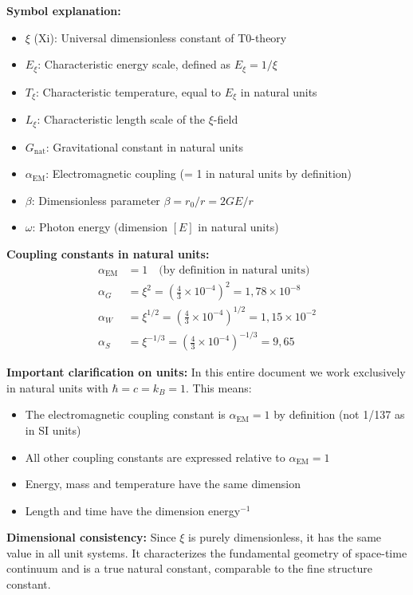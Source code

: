 \documentclass[12pt,a4paper]{report}
\begin{document}
	\textbf{Symbol explanation:}
	\begin{itemize}
		\item $\xi$ (Xi): Universal dimensionless constant of T0-theory
		\item $E_\xi$: Characteristic energy scale, defined as $E_\xi = 1/\xi$
		\item $T_\xi$: Characteristic temperature, equal to $E_\xi$ in natural units
		\item $L_\xi$: Characteristic length scale of the $\xi$-field
		\item $G_{\text{nat}}$: Gravitational constant in natural units
		\item $\alpha_{\text{EM}}$: Electromagnetic coupling (= 1 in natural units by definition)
		\item $\beta$: Dimensionless parameter $\beta = r_0/r = 2GE/r$
		\item $\omega$: Photon energy (dimension $[E]$ in natural units)
	\end{itemize}
	
	\textbf{Coupling constants in natural units:}
	\begin{align}
		\alpha_{\text{EM}} &= 1 \quad \text{(by definition in natural units)} \\
		\alpha_G &= \xi^2 = \left(\frac{4}{3} \times 10^{-4}\right)^2 = 1{,}78 \times 10^{-8} \\
		\alpha_W &= \xi^{1/2} = \left(\frac{4}{3} \times 10^{-4}\right)^{1/2} = 1{,}15 \times 10^{-2} \\
		\alpha_S &= \xi^{-1/3} = \left(\frac{4}{3} \times 10^{-4}\right)^{-1/3} = 9{,}65
	\end{align}
	
	\textbf{Important clarification on units:}
	In this entire document we work exclusively in natural units with $\hbar = c = k_B = 1$. This means:
	\begin{itemize}
		\item The electromagnetic coupling constant is $\alpha_{\text{EM}} = 1$ by definition (not 1/137 as in SI units)
		\item All other coupling constants are expressed relative to $\alpha_{\text{EM}} = 1$
		\item Energy, mass and temperature have the same dimension
		\item Length and time have the dimension energy$^{-1}$
	\end{itemize}
	
	\textbf{Dimensional consistency:} Since $\xi$ is purely dimensionless, it has the same value in all unit systems. It characterizes the fundamental geometry of space-time continuum and is a true natural constant, comparable to the fine structure constant.
	
\end{document}
